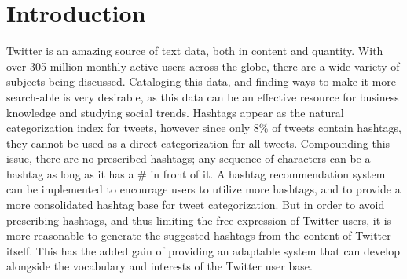 \documentclass{acm_proc_article-sp}
\begin{document}
\section{Introduction}
\hspace*{5mm}Twitter is an amazing source of text data, both in content and quantity. With over 305 million monthly active users across the globe, there are a wide variety of subjects being discussed. Cataloging this data, and finding ways to make it more search-able is very desirable, as this data can be an effective resource for business knowledge and studying social trends. Hashtags appear as the natural categorization index for tweets, however since only 8\% of tweets contain hashtags, they cannot be used as a direct categorization for all tweets. Compounding this issue, there are no prescribed hashtags; any sequence of characters can be a hashtag as long as it has a \# in front of it. A hashtag recommendation system can be implemented to encourage users to utilize more hashtags, and to provide a more consolidated hashtag base for tweet categorization. But in order to avoid prescribing hashtags, and thus limiting the free expression of Twitter users, it is more reasonable to generate the suggested hashtags from the content of Twitter itself. This has the added gain of providing an adaptable system that can develop alongside the vocabulary and interests of the Twitter user base.
\end{document}
